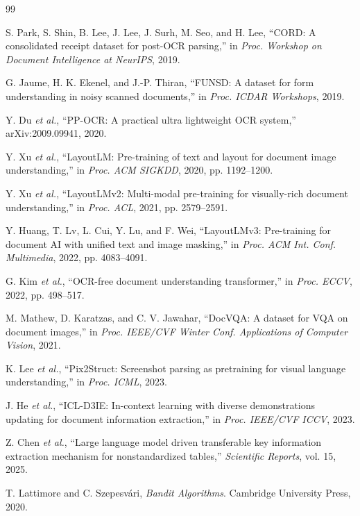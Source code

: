\documentclass[conference,a4paper]{IEEEtran}
\begin{document}
\begin{thebibliography}{99}

 S. Park, S. Shin, B. Lee, J. Lee, J. Surh, M. Seo, and H. Lee, ``CORD: A consolidated receipt dataset for post-OCR parsing,'' in \emph{Proc. Workshop on Document Intelligence at NeurIPS}, 2019.

 G. Jaume, H. K. Ekenel, and J.-P. Thiran, ``FUNSD: A dataset for form understanding in noisy scanned documents,'' in \emph{Proc. ICDAR Workshops}, 2019.

 Y. Du \emph{et al.}, ``PP-OCR: A practical ultra lightweight OCR system,'' arXiv:2009.09941, 2020.

 Y. Xu \emph{et al.}, ``LayoutLM: Pre-training of text and layout for document image understanding,'' in \emph{Proc. ACM SIGKDD}, 2020, pp. 1192--1200.

 Y. Xu \emph{et al.}, ``LayoutLMv2: Multi-modal pre-training for visually-rich document understanding,'' in \emph{Proc. ACL}, 2021, pp. 2579--2591.

 Y. Huang, T. Lv, L. Cui, Y. Lu, and F. Wei, ``LayoutLMv3: Pre-training for document AI with unified text and image masking,'' in \emph{Proc. ACM Int. Conf. Multimedia}, 2022, pp. 4083--4091.

 G. Kim \emph{et al.}, ``OCR-free document understanding transformer,'' in \emph{Proc. ECCV}, 2022, pp. 498--517.

 M. Mathew, D. Karatzas, and C. V. Jawahar, ``DocVQA: A dataset for VQA on document images,'' in \emph{Proc. IEEE/CVF Winter Conf. Applications of Computer Vision}, 2021.

 K. Lee \emph{et al.}, ``Pix2Struct: Screenshot parsing as pretraining for visual language understanding,'' in \emph{Proc. ICML}, 2023.

 J. He \emph{et al.}, ``ICL-D3IE: In-context learning with diverse demonstrations updating for document information extraction,'' in \emph{Proc. IEEE/CVF ICCV}, 2023.

 Z. Chen \emph{et al.}, ``Large language model driven transferable key information extraction mechanism for nonstandardized tables,'' \emph{Scientific Reports}, vol. 15, 2025.

 T. Lattimore and C. Szepesv\'ari, \emph{Bandit Algorithms}. Cambridge University Press, 2020.


\end{thebibliography}
\end{document}
